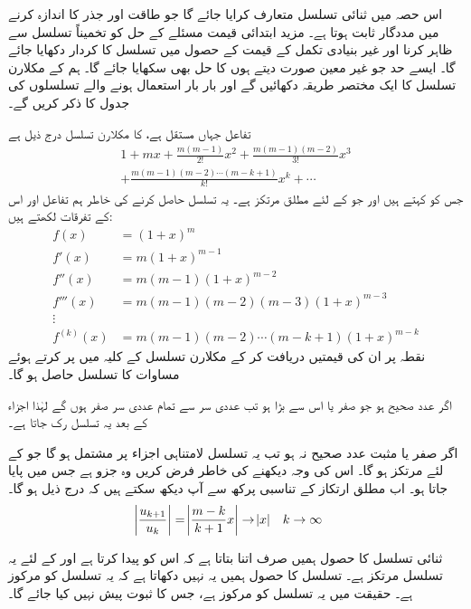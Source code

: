 اس حصہ میں ثنائی تسلسل متعارف کرایا جائے گا جو طاقت اور جذر کا اندازہ  کرنے میں مددگار ثابت ہوتا ہے۔ مزید ابتدائی قیمت مسئلے کے حل کو تخمیناً تسلسل سے ظاہر کرنا اور غیر بنیادی تکمل کے قیمت کے حصول میں تسلسل کا کردار دکھایا جائے گا۔ ایسے حد جو غیر معین صورت دیتے ہوں کا حل بھی سکھایا جائے گا۔  ہم  کے مکلارن تسلسل کا ایک مختصر طریقہ دکھائیں گے اور بار بار استعمال ہونے والے تسلسلوں کی جدول کا ذکر کریں گے۔

تفاعل  جہاں  مستقل ہے، کا مکلارن تسلسل درج ذیل ہے
\begin{multline}\label{مساوات_تسلسل_ثنائی_الف}
1+mx+\frac{m(m-1)}{2!}x^2+\frac{m(m-1)(m-2)}{3!}x^3\\
+\frac{m(m-1)(m-2)\cdots (m-k+1)}{k!}x^k+\cdots
\end{multline}
جس کو  کہتے ہیں اور جو  کے لئے مطلق مرتکز ہے۔ یہ تسلسل حاصل کرنے کی خاطر ہم تفاعل اور اس کے تفرقات لکھتے ہیں:
\begin{align*}
f(x)&=(1+x)^m\\
f'(x)&=m(1+x)^{m-1}\\
f''(x)&=m(m-1)(1+x)^{m-2}\\
f'''(x)&=m(m-1)(m-2)(m-3)(1+x)^{m-3}\\
\vdots\\
f^{(k)}(x)&=m(m-1)(m-2)\cdots(m-k+1)(1+x)^{m-k}
\end{align*}
نقطہ   پر ان کی قیمتیں دریافت کر کے مکلارن تسلسل کے کلیہ میں پر کرتے ہوئے مساوات  کا تسلسل حاصل ہو گا۔

اگر  عدد صحیح ہو جو صفر یا اس سے بڑا ہو تب  عددی سر سے تمام عددی سر صفر ہوں گے لہٰذا  اجزاء کے بعد یہ تسلسل رک جاتا ہے۔

اگر  صفر یا مثبت عدد صحیح نہ ہو تب یہ تسلسل لامتناہی اجزاء پر مشتمل ہو گا جو  کے لئے مرتکز ہو گا۔ اس کی وجہ دیکھنے کی خاطر فرض کریں  وہ جزو ہے جس میں   پایا جاتا ہو۔ اب مطلق ارتکاز کے تناسبی پرکھ سے آپ دیکھ سکتے ہیں کہ درج ذیل ہو گا۔ 
\begin{align*}
\abs{\frac{u_{k+1}}{u_k}}&=\abs{\frac{m-k}{k+1}x}\to \abs{x}&&k\to \infty
\end{align*}

ثنائی تسلسل کا حصول ہمیں صرف اتنا بتاتا ہے کہ   اس کو پیدا کرتا ہے اور  کے لئے یہ تسلسل مرتکز ہے۔ تسلسل کا حصول ہمیں یہ نہیں دکھاتا ہے کہ یہ تسلسل  کو مرکوز ہے۔ حقیقت میں یہ تسلسل  کو مرکوز ہے، جس کا ثبوت پیش نہیں کیا جائے گا۔

